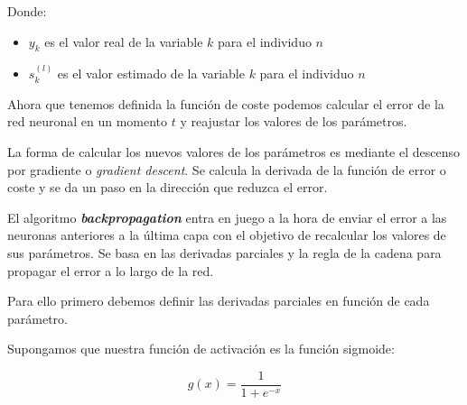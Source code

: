 Donde:

\begin{itemize}
    \item $y_k$ es el valor real de la variable $k$ para el individuo $n$
    \item $s^{(l)}_k$ es el valor estimado de la variable $k$ para el individuo $n$
\end{itemize}

Ahora que tenemos definida la función de coste podemos calcular el error de la red neuronal en un momento $t$ y reajustar los valores de los parámetros.

La forma de calcular los nuevos valores de los parámetros es mediante el descenso por gradiente o \textit{gradient descent}. Se calcula la derivada de la función de error o coste y se da un paso en la dirección que reduzca el error.

El algoritmo \textbf{\textit{backpropagation}} entra en juego a la hora de enviar el error a las neuronas anteriores a la última capa con el objetivo de recalcular los valores de sus parámetros. Se basa en las derivadas parciales y la regla de la cadena para propagar el error a lo largo de la red.

Para ello primero debemos definir las derivadas parciales en función de cada parámetro.

Supongamos que nuestra función de activación es la función sigmoide:

\begin{equation*}
    g(x) = \frac{1}{1 + e^{-x}}
\end{equation*}